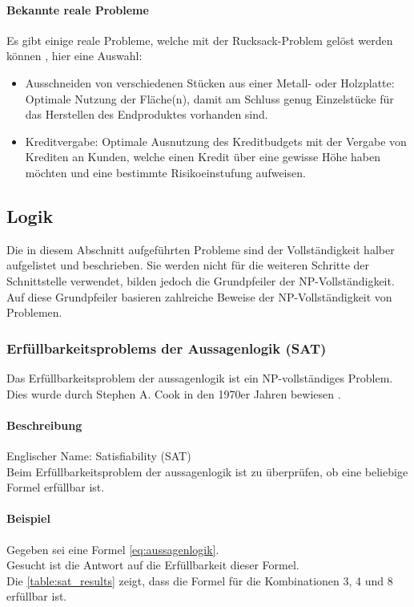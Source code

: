 	\paragraph{Bekannte reale Probleme}
	Es gibt einige reale Probleme, welche mit der Rucksack-Problem gelöst werden können \cite{kellerer2004knapsack}, hier eine Auswahl:	
	\begin{itemize}
		\item Ausschneiden von verschiedenen Stücken aus einer Metall- oder Holzplatte: Optimale Nutzung der Fläche(n), damit am Schluss genug Einzelstücke für das Herstellen 
			des Endproduktes vorhanden sind.
		\item Kreditvergabe: Optimale Ausnutzung des Kreditbudgets mit der Vergabe von Krediten an Kunden, welche einen Kredit über eine gewisse Höhe haben möchten und eine 
			bestimmte Risikoeinstufung aufweisen.
	\end{itemize}


\newpage
\subsection{Logik}\label{logic}
Die in diesem Abschnitt aufgeführten Probleme sind der Vollständigkeit halber aufgelistet und beschrieben. Sie werden nicht für die weiteren Schritte der Schnittstelle verwendet, bilden jedoch 
die Grundpfeiler der NP-Vollständigkeit. Auf diese Grundpfeiler basieren zahlreiche Beweise der NP-Vollständigkeit von Problemen.

	\subsubsection{Erfüllbarkeitsproblems der Aussagenlogik (SAT)}\label{sat}
	Das Erfüllbarkeitsproblem der \gls{aussagenlogik} ist ein NP-vollständiges Problem. Dies wurde durch Stephen A. Cook in den 1970er Jahren bewiesen \cite{cook_complexity}.

	\paragraph{Beschreibung}
	Englischer Name: Satisfiability (SAT)\\
	Beim Erfüllbarkeitsproblem der \gls{aussagenlogik} ist zu überprüfen, ob eine beliebige  Formel erfüllbar ist.	

	\paragraph{Beispiel} Gegeben sei eine  Formel \ref{eq:aussagenlogik}.\\
	Gesucht ist die Antwort auf die Erfüllbarkeit dieser Formel.\\
	Die \autoref{table:sat_results} zeigt, dass die Formel für die Kombinationen 3, 4 und 8 erfüllbar ist.

